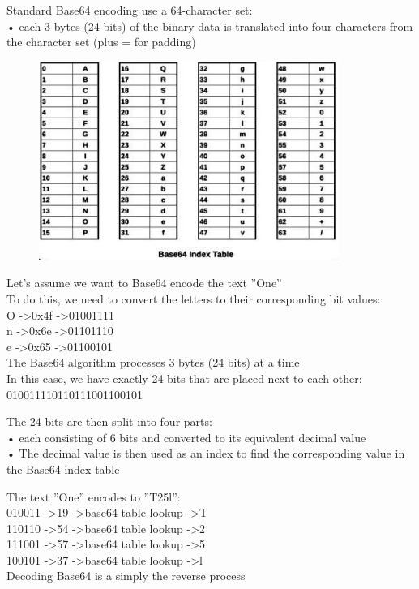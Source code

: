 \documentclass[]{project_plan}
\begin{document}
Standard Base64 encoding use a 64-character set:\\
• each 3 bytes (24 bits) of the binary data is translated into four characters from the character set
(plus = for padding)

\begin{figure}
  \centering
  \includegraphics[width=.5\linewidth]{base64 table.png}
\end{figure}

Let’s assume we want to Base64 encode the text ”One”\\
To do this, we need to convert the letters to their corresponding bit values:\\
O -\textgreater 0x4f -\textgreater 01001111\\
n -\textgreater 0x6e -\textgreater 01101110\\
e -\textgreater 0x65 -\textgreater 01100101\\
The Base64 algorithm processes 3 bytes (24 bits) at a time\\
In this case, we have exactly 24 bits that are placed next to each other:\\
010011110110111001100101

The 24 bits are then split into four parts:\\
• each consisting of 6 bits and converted to its equivalent decimal value\\
• The decimal value is then used as an index to find the corresponding value in the Base64 index
table

The text ”One” encodes to ”T25l”:\\
010011 -\textgreater 19 -\textgreater base64 table lookup -\textgreater T\\
110110 -\textgreater 54 -\textgreater base64 table lookup -\textgreater 2\\
111001 -\textgreater 57 -\textgreater base64 table lookup -\textgreater 5\\
100101 -\textgreater 37 -\textgreater base64 table lookup -\textgreater l\\
Decoding Base64 is a simply the reverse process\\
\end{document}
